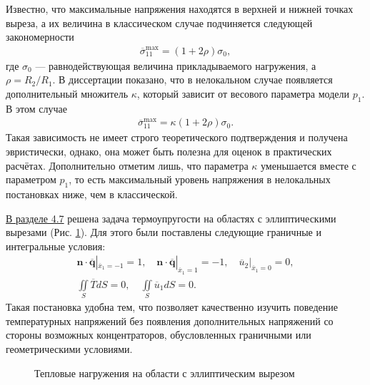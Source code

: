 Известно, что максимальные напряжения находятся в верхней и нижней точках выреза, а их величина в классическом случае подчиняется следующей закономерности
\begin{gather*}
	\overline{\sigma}_{11}^{\max} = \left( 1 + 2 \rho \right) \sigma_0,
\end{gather*}
где $\sigma_0$ --- равнодействующая величина прикладываемого нагружения, а $\rho = R_2 / R_1$. В диссертации показано, что в нелокальном случае появляется дополнительный множитель $\kappa$, который зависит от весового параметра модели $p_1$. В этом случае
 \begin{gather*}
	\overline{\sigma}_{11}^{\max} = \kappa \left( 1 + 2 \rho \right) \sigma_0.
\end{gather*}
Такая зависимость не имеет строго теоретического подтверждения и получена эвристически, однако, она может быть полезна для оценок в практических расчётах. Дополнительно отметим лишь, что параметра $\kappa$ уменьшается вместе с параметром $p_1$, то есть максимальный уровень напряжения в нелокальных постановках ниже, чем в классической.

\underline{В разделе 4.7} решена задача термоупругости на областях с эллиптическими вырезами (Рис. \ref{fig:ThermalKirshProblem}). Для этого были поставлены следующие граничные и интегральные условия:
\begin{gather*}
	\boldsymbol{n} \cdot \overline{\boldsymbol{q}}|_{\overline{x}_1 = -1} = 1,
	\quad
	\boldsymbol{n} \cdot \overline{\boldsymbol{q}}|_{\overline{x}_1 = 1} = -1,
	\quad
	\overline{u}_2 |_{\overline{x}_1 = 0} = 0,
	\\
	\iint\limits_S \overline{T} dS = 0,
	\quad
	\iint\limits_S \overline{u}_1 dS = 0.
\end{gather*}
Такая постановка удобна тем, что позволяет качественно изучить поведение температурных напряжений без появления дополнительных напряжений со стороны возможных концентраторов, обусловленных граничными или геометрическими условиями.

\begin{figure}[ht]
    \caption{Тепловые нагружения на области с эллиптическим вырезом}
    \label{fig:ThermalKirshProblem}
\end{figure}

